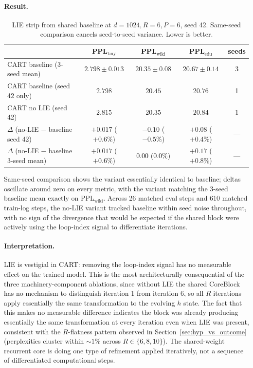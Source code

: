 \documentclass{article}
\newcommand{\cart}{\textsc{CART}}
\newcommand{\pplwiki}{PPL$_\text{wiki}$}
\newcommand{\ppltiny}{PPL$_\text{tiny}$}
\newcommand{\ppledu}{PPL$_\text{edu}$}
\begin{document}
\paragraph{Result.}

\begin{table}[htbp]
\centering
\caption{LIE strip from shared baseline at $d{=}1024, R{=}6, P{=}6$, seed 42. Same-seed comparison cancels seed-to-seed variance. Lower is better.}
\label{tab:abl_lie}
\footnotesize
\begin{tabular}{lcccc}
\toprule
 & \ppltiny & \pplwiki & \ppledu & seeds \\
\midrule
\cart{} baseline (3-seed mean)                    & $2.798 \pm 0.013$ & $20.35 \pm 0.08$ & $20.67 \pm 0.14$ & 3 \\
\cart{} baseline (seed 42 only)                   & $2.798$           & $20.45$          & $20.76$          & 1 \\
\cart{} no LIE (seed 42)                          & $2.815$           & $20.35$          & $20.84$          & 1 \\
\midrule
$\Delta$ (no-LIE $-$ baseline seed 42)            & $+0.017$ ($+0.6\%$) & $-0.10$ ($-0.5\%$) & $+0.08$ ($+0.4\%$) & --- \\
$\Delta$ (no-LIE $-$ baseline 3-seed mean)        & $+0.017$ ($+0.6\%$) & $0.00$ ($0.0\%$) & $+0.17$ ($+0.8\%$) & --- \\
\bottomrule
\end{tabular}
\end{table}

Same-seed comparison shows the variant essentially identical to baseline; deltas oscillate around zero on every metric, with the variant matching the 3-seed baseline mean exactly on \pplwiki. Across 26 matched eval steps and 610 matched train-log steps, the no-LIE variant tracked baseline within seed noise throughout, with no sign of the divergence that would be expected if the shared block were actively using the loop-index signal to differentiate iterations.

\paragraph{Interpretation.}
LIE is vestigial in \cart{}: removing the loop-index signal has no measurable effect on the trained model. This is the most architecturally consequential of the three machinery-component ablations, since without LIE the shared CoreBlock has no mechanism to distinguish iteration 1 from iteration 6, so all $R$ iterations apply essentially the same transformation to the evolving $h$ state. The fact that this makes no measurable difference indicates the block was already producing essentially the same transformation at every iteration even when LIE was present, consistent with the $R$-flatness pattern observed in Section~\ref{sec:hyp_vs_outcome} (perplexities cluster within $\sim 1\%$ across $R \in \{6, 8, 10\}$). The shared-weight recurrent core is doing one type of refinement applied iteratively, not a sequence of differentiated computational steps.
\end{document}
